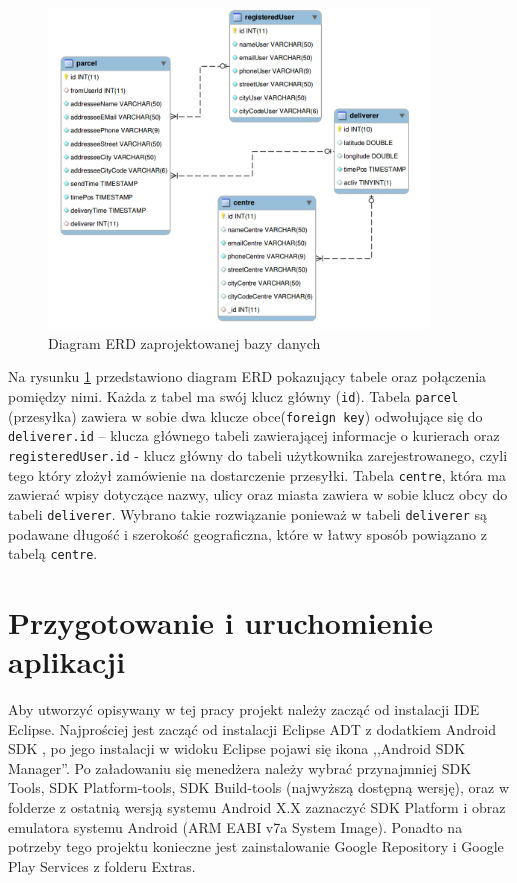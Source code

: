 \documentclass[eng,printmode,oneside]{mgr}
\begin{document}
\begin{figure}[ht!]
\centering
\includegraphics[width=0.9\textwidth]{ERD.png}
\caption{Diagram ERD zaprojektowanej bazy danych}
\label{fig:ERD}
\end{figure}

Na rysunku \ref{fig:ERD} przedstawiono diagram ERD pokazujący tabele oraz
połączenia pomiędzy nimi. Każda z tabel ma swój klucz główny (\texttt{id}).
Tabela \texttt{parcel} (przesyłka) zawiera w sobie dwa klucze obce(\texttt{foreign
key}) odwołujące się do \texttt{deliverer.id} -- klucza głównego
tabeli zawierającej informacje o kurierach oraz \texttt{registeredUser.id} -
klucz główny do tabeli użytkownika zarejestrowanego, czyli tego który złożył
zamówienie na dostarczenie przesyłki. Tabela \texttt{centre}, która ma zawierać
wpisy dotyczące nazwy, ulicy oraz miasta zawiera w sobie klucz obcy do tabeli
\texttt{deliverer}. Wybrano takie rozwiązanie ponieważ w tabeli
\texttt{deliverer} są podawane długość i szerokość geograficzna, które w łatwy sposób powiązano z tabelą \texttt{centre}.

\chapter{Przygotowanie i uruchomienie aplikacji}

Aby utworzyć opisywany w tej pracy projekt należy zacząć od instalacji IDE
Eclipse. Najprościej jest zacząć od instalacji Eclipse ADT z dodatkiem Android
SDK \cite{eclipse}, po jego instalacji w widoku Eclipse pojawi się ikona
,,Android SDK Manager''. Po załadowaniu się menedżera należy wybrać przynajmniej
SDK Tools, SDK Platform-tools, SDK Build-tools (najwyższą dostępną wersję), oraz w folderze z ostatnią wersją systemu Android X.X zaznaczyć SDK Platform i
obraz emulatora systemu Android (ARM EABI v7a System Image). Ponadto na
potrzeby tego projektu konieczne jest zainstalowanie Google Repository i Google
Play Services z folderu Extras.
\end{document}
